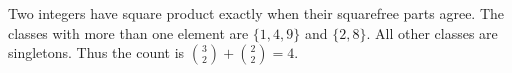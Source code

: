 Two integers have square product exactly when their squarefree parts agree. The classes with more than one element are $\{1,4,9\}$ and $\{2,8\}$. All other classes are singletons. Thus the count is $\binom32+\binom22=\boxed4$.
